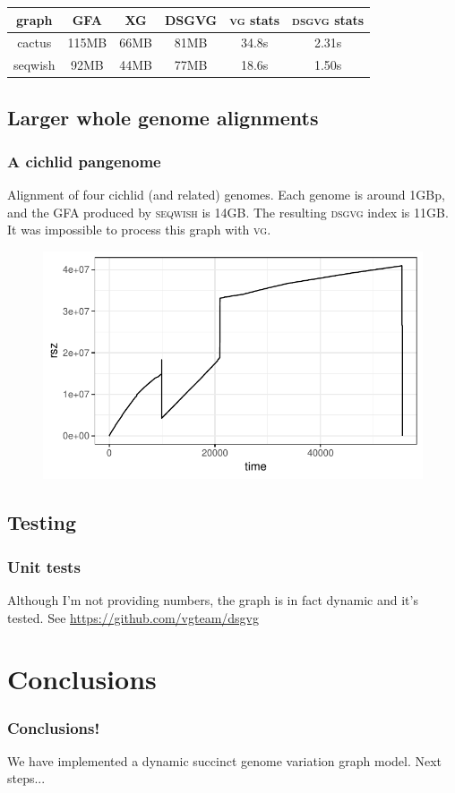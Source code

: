 \documentclass{beamer}
\begin{document}
\begin{frame}[fragile]
\begin{columns}[c]
\begin{figure}
    \end{figure}
  \end{columns}
    \begin{center}
  \begin{tabular}{ | c | c | c | c | c | c | }
    \hline
    graph & GFA & XG & DSGVG & \textsc{vg} stats & \textsc{dsgvg} stats \\
    \hline
    \hline
    cactus & 115MB & 66MB & 81MB & 34.8s & 2.31s \\
    seqwish & 92MB & 44MB & 77MB & 18.6s & 1.50s \\
    \hline  
  \end{tabular}
  \end{center}
\end{frame}

\subsection{Larger whole genome alignments}
\begin{frame}
  \frametitle{A cichlid pangenome}
  Alignment of four cichlid (and related) genomes.
  Each genome is around 1GBp, and the GFA produced by \textsc{seqwish} is 14GB.
  The resulting \textsc{dsgvg} index is 11GB.
  It was impossible to process this graph with \textsc{vg}.
  \begin{figure}
    \includegraphics[scale=0.7,center]{cichlid_log.pdf}
  \end{figure}
\end{frame}

\subsection{Testing}
\begin{frame}
  \frametitle{Unit tests}
  Although I'm not providing numbers, the graph is in fact dynamic and it's tested. See \url{https://github.com/vgteam/dsgvg}
\end{frame}

\section{Conclusions}
\begin{frame}
  \frametitle{Conclusions!}
  We have implemented a dynamic succinct genome variation graph model.
  Next steps...
\end{frame}
\end{document}
